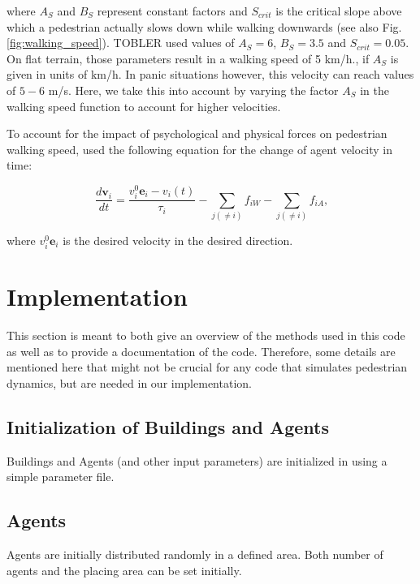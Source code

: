 \documentclass[11pt]{article}
\begin{document}
where $A_S$ and $B_{S}$ represent constant factors and $S_{crit}$ is the critical slope above which a pedestrian actually slows down while walking downwards (see also Fig.\ref{fig:walking_speed}). TOBLER used values of $A_S = 6$, $B_S = 3.5$ and $S_{crit} = 0.05$. On flat terrain, those parameters result in a walking speed of 5 km/h., if $A_S$ is given in units of km/h. In panic situations however, this velocity can reach values of $5-6$ m/s. Here, we take this into account by varying the factor $A_S$ in the walking speed function to account for higher velocities.

To account for the impact of psychological and physical forces on pedestrian walking speed, \citet{Helbing2000} used the following equation for the change of agent velocity in time:

\begin{equation}
	\frac{d \mathbf{v}_i}{dt} = \frac{v_i^0\mathbf{e}_i - v_i(t)}{\tau_i} - \sum_{j(\ne i)}f_{iW} - \sum_{j(\ne i)}f_{iA}\mbox{,}
\end{equation}

where $v_i^0\mathbf{e}_i$ is the desired velocity in the desired direction.






\section{Implementation}\label{sec:implementation}

This section is meant to both give an overview of the methods used in this code as well as to provide a documentation of the code. Therefore, some details are mentioned here that might not be crucial for any code that simulates pedestrian dynamics, but are needed in our implementation. 

\subsection{Initialization of Buildings and Agents}

Buildings and Agents (and other input parameters) are initialized in using a simple parameter file. 

\subsection{Agents}

Agents are initially distributed randomly in a defined area. Both number of agents and the placing area can be set initially.
\end{document}
